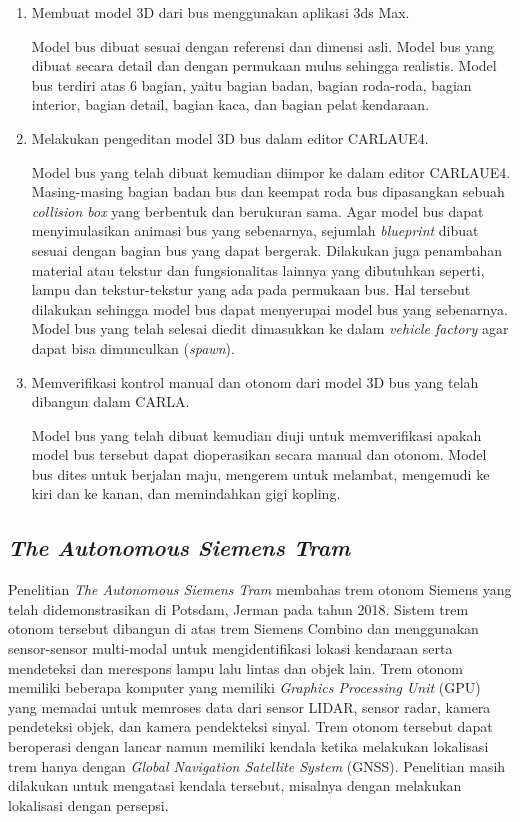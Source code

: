 \begin{enumerate}

    \item Membuat model 3D dari bus menggunakan aplikasi 3ds Max.

    Model bus dibuat sesuai dengan referensi dan dimensi asli. Model bus yang
    dibuat secara detail dan dengan permukaan mulus sehingga realistis. Model
    bus terdiri atas 6 bagian, yaitu bagian badan, bagian roda-roda, bagian
    interior, bagian detail, bagian kaca, dan bagian pelat kendaraan.

    \item Melakukan pengeditan model 3D bus dalam editor CARLAUE4.

    Model bus yang telah dibuat kemudian diimpor ke dalam editor CARLAUE4.
    Masing-masing bagian badan bus dan keempat roda bus dipasangkan sebuah
    \textit{collision box} yang berbentuk dan berukuran sama. Agar model bus
    dapat menyimulasikan animasi bus yang sebenarnya, sejumlah
    \textit{blueprint} dibuat sesuai dengan bagian bus yang dapat bergerak.
    Dilakukan juga penambahan material atau tekstur dan fungsionalitas lainnya
    yang dibutuhkan seperti, lampu dan tekstur-tekstur yang ada pada permukaan
    bus. Hal tersebut dilakukan sehingga model bus dapat menyerupai model bus
    yang sebenarnya. Model bus yang telah selesai diedit dimasukkan ke dalam
    \textit{vehicle factory} agar dapat bisa dimunculkan (\textit{spawn}).

    \item Memverifikasi kontrol manual dan otonom dari model 3D bus yang telah
    dibangun dalam CARLA.

    Model bus yang telah dibuat kemudian diuji untuk memverifikasi apakah model
    bus tersebut dapat dioperasikan secara manual dan otonom. Model bus dites
    untuk berjalan maju, mengerem untuk melambat, mengemudi ke kiri dan ke
    kanan, dan memindahkan gigi kopling.

\end{enumerate}

\subsection{\textit{The Autonomous Siemens Tram} \parencite{at-palmer}}

Penelitian \textit{The Autonomous Siemens Tram} membahas trem otonom Siemens
yang telah didemonstrasikan di Potsdam, Jerman pada tahun 2018. Sistem trem
otonom tersebut dibangun di atas trem Siemens Combino dan menggunakan
sensor-sensor multi-modal untuk mengidentifikasi lokasi kendaraan serta
mendeteksi dan merespons lampu lalu lintas dan objek lain. Trem otonom memiliki
beberapa komputer yang memiliki \textit{Graphics Processing Unit} (GPU) yang
memadai untuk memroses data dari sensor LIDAR, sensor radar, kamera pendeteksi
objek, dan kamera pendekteksi sinyal. Trem otonom tersebut dapat beroperasi
dengan lancar namun memiliki kendala ketika melakukan lokalisasi trem hanya
dengan \textit{Global Navigation Satellite System} (GNSS). Penelitian masih
dilakukan untuk mengatasi kendala tersebut, misalnya dengan melakukan lokalisasi
dengan persepsi.
